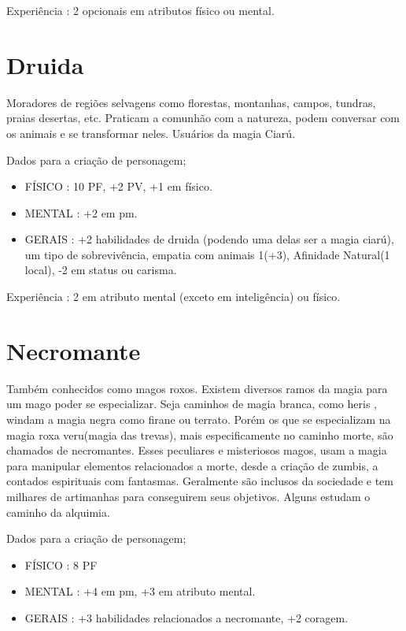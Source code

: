 Experiência : 2 opcionais em atributos físico ou mental.

\section{Druida}

Moradores de regiões selvagens como florestas, montanhas, campos, tundras, praias desertas, etc. Praticam a comunhão com a natureza, podem conversar com os animais e se transformar neles. Usuários da magia Ciarú.

Dados para a criação de personagem;

\begin{itemize}


	\item FÍSICO : 10 PF, +2 PV, +1 em físico.

	\item MENTAL : +2 em pm.

	\item GERAIS : +2 habilidades de druida (podendo uma delas ser a magia ciarú), um tipo de sobrevivência, empatia com animais 1(+3), Afinidade Natural(1 local), -2 em status ou carisma.

\end{itemize}

Experiência : 2 em atributo mental (exceto em inteligência) ou físico.

\section{Necromante}

Também conhecidos como magos roxos. Existem diversos ramos da magia para um mago poder se especializar. Seja caminhos de magia branca, como heris , windam a magia negra como firane ou terrato. Porém os que se especializam na magia roxa veru(magia das trevas), mais especificamente no caminho morte, são chamados de necromantes. Esses peculiares e misteriosos magos, usam a magia para manipular elementos relacionados a morte, desde a criação de zumbis, a contados espirituais com fantasmas. Geralmente são inclusos da sociedade e tem milhares de artimanhas para conseguirem seus objetivos. Alguns estudam o caminho da alquimia.

Dados para a criação de personagem;

\begin{itemize}


	\item FÍSICO : 8 PF   

	\item MENTAL : +4 em pm, +3 em atributo mental.

	\item GERAIS : +3 habilidades relacionados a necromante, +2 coragem.


\end{itemize}

